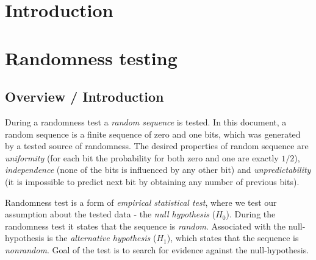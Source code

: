 \documentclass[
  digital,     %
  oneside,     %
  nosansbold,  %
  nocolorbold, %
  nolof,         %
  nolot,         %
]{fithesis4}
\begin{document}
\chapter*{Introduction}


\chapter{Randomness testing}

\section{Overview / Introduction}



During a randomness test a \emph{random sequence} is tested. In this document, a random sequence is a finite sequence of zero and one bits, which was generated by a tested source of randomness. The desired properties of random sequence are \emph{uniformity} (for each bit the probability for both zero and one are exactly $1/2$), \emph{independence} (none of the bits is influenced by any other bit) and \emph{unpredictability} (it is impossible to predict next bit by obtaining any number of previous bits). \cite[p. 1-1]{nist_special}


Randomness test is a form of \emph{empirical statistical test}, where we test our assumption about the tested data - the \emph{null hypothesis} ($H_0$). During the randomness test it states that the sequence is \emph{random}. Associated with the null-hypothesis is the \emph{alternative hypothesis} ($H_1$), which states that the sequence is \emph{nonrandom}. Goal of the test is to search for evidence against the null-hypothesis. \cite[p. 2]{tu01_guide}
\end{document}
